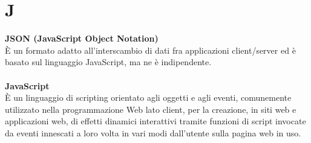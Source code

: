 \section{J}
\textbf{JSON (JavaScript Object Notation)}\\
È un formato adatto all'interscambio di dati fra applicazioni client/server ed è basato sul linguaggio JavaScript, ma ne è indipendente. \\ \\
\textbf{JavaScript}\\
È un linguaggio di scripting orientato agli oggetti e agli eventi, comunemente utilizzato nella programmazione Web lato client, per la creazione, in siti web e applicazioni web, di effetti dinamici interattivi tramite funzioni di script invocate da eventi innescati a loro volta in vari modi dall'utente sulla pagina web in uso. \\ \\
\clearpage